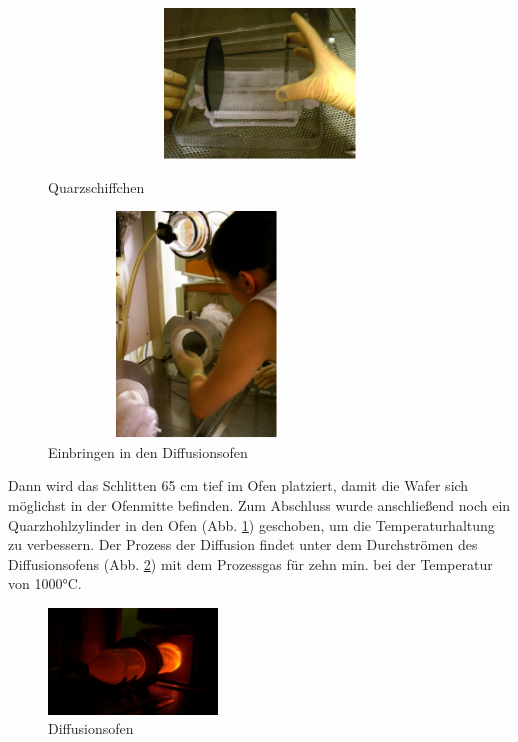 \begin{figure}[H]
\centering
\begin{minipage}[hbt]{6cm}
    \centering
    \includegraphics[width=1\textwidth, height=4cm]{bilder/Quarzschiffchen.png}
  \caption{Quarzschiffchen}
  \label{fig:Quarzschiffchen}
\end{minipage}
\begin{minipage}[hbt]{7cm}
    \centering
    \includegraphics[width=0.7\textwidth,height=6cm]{bilder/einbringeninDiffusionsofen.png}
  \caption{Einbringen in den Diffusionsofen}
  \label{fig:einbringeninDiffusionsofen}
\end{minipage}

\end{figure}

Dann wird das Schlitten 65 cm tief im Ofen platziert, damit die Wafer sich möglichst in der Ofenmitte befinden.
Zum Abschluss wurde anschließend noch ein Quarzhohlzylinder in den Ofen (Abb. \ref{fig:einbringeninDiffusionsofen}) geschoben, um die Temperaturhaltung zu verbessern.
Der Prozess der Diffusion findet unter dem Durchströmen des Diffusionsofens (Abb. \ref{fig:diffusionsofen}) mit dem Prozessgas für zehn min. bei der Temperatur von 1000°C.

\begin{figure}[H]
    \centering
        \includegraphics[width=0.4\textwidth]{bilder/diffusionsofen.png}
    \caption{Diffusionsofen}
    \label{fig:diffusionsofen}
\end{figure}

